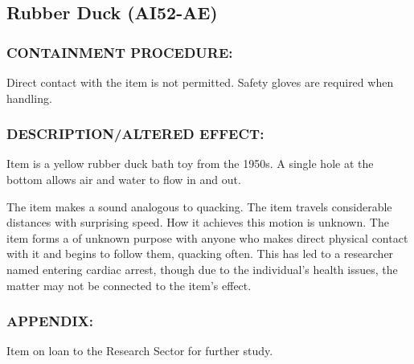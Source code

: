 \subsection*{Rubber Duck (AI52-AE)}
\subsubsection*{CONTAINMENT PROCEDURE:}
\par Direct contact with the item is not
permitted. Safety gloves are required
when handling.
\subsubsection*{DESCRIPTION/ALTERED EFFECT:}
\par Item is a yellow rubber duck bath toy
from the 1950s. A single hole at the
bottom allows air and water to flow in
and out.
\par The item makes a sound analogous to quacking. The item travels
considerable distances with surprising speed. How it achieves
this motion is unknown. The item forms a  of
unknown purpose with anyone who makes direct physical contact
with it and begins to follow them, quacking often. This has led to a
researcher named  entering cardiac
arrest, though due to the individual's health issues, the matter may
not be connected to the item's effect.
\subsubsection*{APPENDIX:}
\par Item on loan to the Research Sector for further study.